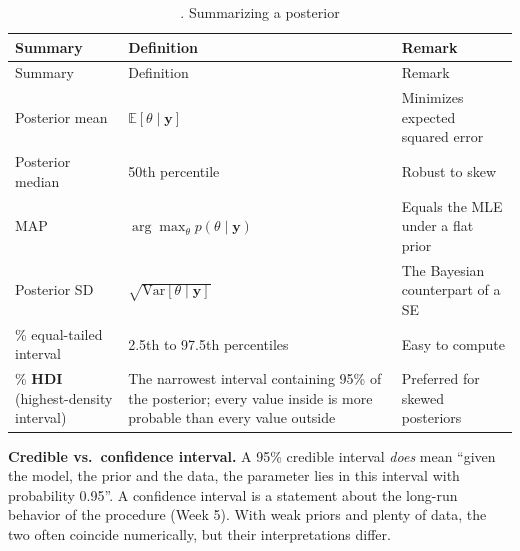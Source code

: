 \begin{longtable}[]{@{}
  >{\raggedright\arraybackslash}p{}
  >{\raggedright\arraybackslash}p{}
  >{\raggedright\arraybackslash}p{}@{}}
\caption{. Summarizing a posterior}\tabularnewline
\toprule\noalign{}
\begin{minipage}[b]{\linewidth}\raggedright
Summary
\end{minipage} & \begin{minipage}[b]{\linewidth}\raggedright
Definition
\end{minipage} & \begin{minipage}[b]{\linewidth}\raggedright
Remark
\end{minipage} \\
\midrule\noalign{}
\endfirsthead
\toprule\noalign{}
\begin{minipage}[b]{\linewidth}\raggedright
Summary
\end{minipage} & \begin{minipage}[b]{\linewidth}\raggedright
Definition
\end{minipage} & \begin{minipage}[b]{\linewidth}\raggedright
Remark
\end{minipage} \\
\midrule\noalign{}
\endhead
\bottomrule\noalign{}
\endlastfoot
Posterior mean & \(\mathbb{E}[\theta \mid \mathbf{y}]\) & Minimizes
expected squared error \\
Posterior median & 50th percentile & Robust to skew \\
MAP & \(\arg\max_\theta p(\theta\mid\mathbf{y})\) & Equals the MLE under
a flat prior \\
Posterior SD & \(\sqrt{\mathrm{Var}[\theta\mid\mathbf{y}]}\) & The
Bayesian counterpart of a SE \\
95\% equal-tailed interval & 2.5th to 97.5th percentiles & Easy to
compute \\
95\% \textbf{HDI} (highest-density interval) & The narrowest interval
containing 95\% of the posterior; every value inside is more probable
than every value outside & Preferred for skewed posteriors \\
\end{longtable}

\textbf{Credible vs.~confidence interval.} A 95\% credible interval
\emph{does} mean ``given the model, the prior and the data, the
parameter lies in this interval with probability 0.95''. A confidence
interval is a statement about the long-run behavior of the procedure
(Week 5). With weak priors and plenty of data, the two often coincide
numerically, but their interpretations differ.

